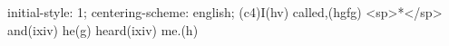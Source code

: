 initial-style: 1;
centering-scheme: english;
(c4)I(hv) called,(hgfg) <sp>*</sp> and(ixiv) he(g) heard(ixiv) me.(h)
